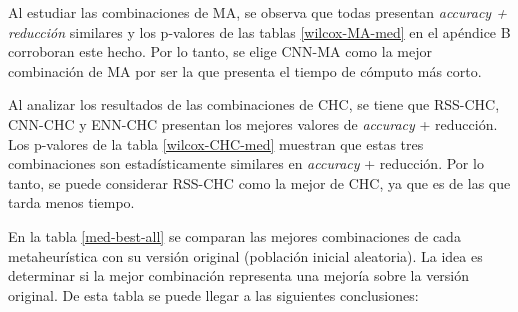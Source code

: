 Al estudiar las combinaciones de MA, se observa que todas presentan \emph{accuracy + reducción} similares y los p-valores de las tablas \ref{wilcox-MA-med} en el apéndice B corroboran este hecho. Por lo tanto, se elige CNN-MA como la mejor combinación de MA por ser la que presenta el tiempo de cómputo más corto.

Al analizar los resultados de las combinaciones de CHC, se tiene que RSS-CHC, CNN-CHC y ENN-CHC presentan los mejores valores de \emph{accuracy} + reducción. Los p-valores de la tabla \ref{wilcox-CHC-med} muestran que estas tres combinaciones son estadísticamente similares en \emph{accuracy} + reducción. Por lo tanto, se puede considerar RSS-CHC como la mejor de CHC, ya que es de las que tarda menos tiempo.

En la tabla \ref{med-best-all} se comparan las mejores combinaciones de cada metaheurística con su versión original (población inicial aleatoria). La idea es determinar si la mejor combinación representa una mejoría sobre la versión original. De esta tabla se puede llegar a las siguientes conclusiones:

